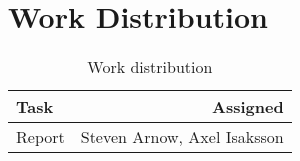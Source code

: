 \section{Work Distribution}
\begin{table}[h]
\centering
\begin{tabular}{| l | r |}
	\hline
	Task & Assigned \\\hline
	Report & Steven Arnow, Axel Isaksson \\
	
	\hline
\end{tabular}
\caption{Work distribution}
\label{tab:readdistance}
\end{table}
